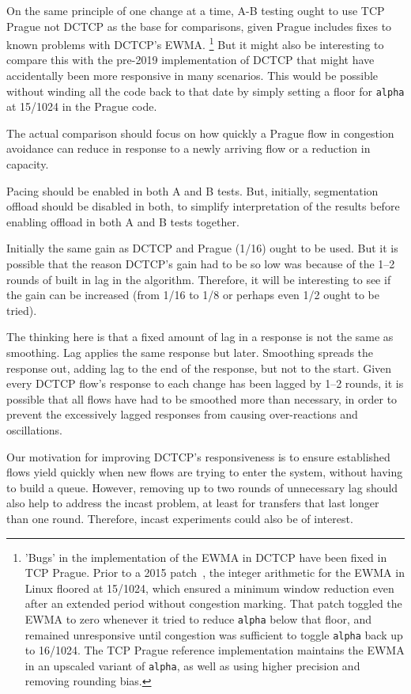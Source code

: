 On the same principle of one change at a time, A-B testing ought to use TCP Prague not DCTCP as the base for comparisons, given Prague includes fixes to known problems with DCTCP's EWMA.%
%
\footnote{'Bugs' in the implementation of the EWMA in DCTCP have been fixed in
	TCP Prague. Prior to a 2015
	patch~\cite{shewmaker15:Linux_DCTCP_EWMA}, the integer arithmetic for the EWMA
	in Linux floored at 15/1024, which ensured a minimum window reduction even after
	an extended period without congestion marking. That patch toggled the EWMA to
	zero whenever it tried to reduce \texttt{alpha} below that floor, and remained
	unresponsive until congestion was sufficient to toggle \texttt{alpha} back up to
	16/1024. The TCP Prague reference implementation maintains the EWMA in an
	upscaled variant of \texttt{alpha}, as well as using higher precision and
	removing rounding bias.}%
%
But it might also be interesting to compare this with the pre-2019
implementation of DCTCP that might have accidentally been more responsive in
many scenarios. This would be possible without winding all the code back to that
date by simply setting a floor for \texttt{alpha} at 15/1024 in the Prague code.

The actual comparison should focus on how quickly a Prague flow in congestion
avoidance can reduce in response to a newly arriving flow or a reduction in
capacity.

Pacing should be enabled in both A and B tests. But, initially, segmentation
offload should be disabled in both, to simplify interpretation of the results before
enabling offload in both A and B tests together.

Initially the same gain as DCTCP and Prague (1/16) ought to be used. But it is possible
that the reason DCTCP's gain had to be so low was because of the 1--2 rounds of
built in lag in the algorithm. Therefore, it will be interesting to see if the
gain can be increased (from 1/16 to 1/8 or perhaps even 1/2 ought to be tried).

The thinking here is that a fixed amount of lag in a response is not the same as
smoothing. Lag applies the same response but later. Smoothing spreads the
response out, adding lag to the end of the response, but not to the start. Given
every DCTCP flow's response to each change has been lagged by 1--2 rounds, it is
possible that all flows have had to be smoothed more than necessary, in order to
prevent the excessively lagged responses from causing over-reactions and
oscillations.

Our motivation for improving DCTCP's responsiveness is to ensure established
flows yield quickly when new flows are trying to enter the system, without
having to build a queue. However, removing up to two rounds of unnecessary lag
should also help to address the incast problem, at least for transfers that last
longer than one round. Therefore, incast experiments could also be of interest.

